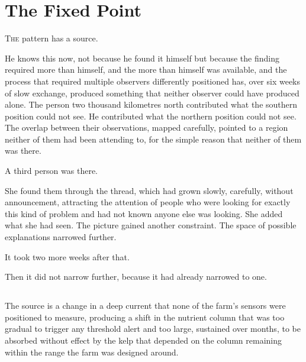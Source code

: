 
\chapter{The Fixed Point}


\lettrine{T}{he} pattern has a source.

He knows this now, not because he found it himself
but because the finding required more than himself,
and the more than himself was available, and the
process that required multiple observers differently
positioned has, over six weeks of slow exchange,
produced something that neither observer could have
produced alone. The person two thousand kilometres
north contributed what the southern position could
not see. He contributed what the northern position
could not see. The overlap between their observations,
mapped carefully, pointed to a region neither of them
had been attending to, for the simple reason that
neither of them was there.

A third person was there.

She found them through the thread, which had grown
slowly, carefully, without announcement, attracting
the attention of people who were looking for exactly
this kind of problem and had not known anyone else
was looking. She added what she had seen. The picture
gained another constraint. The space of possible
explanations narrowed further.

It took two more weeks after that.

Then it did not narrow further, because it had
already narrowed to one.

\section{}

The source is a change in a deep current that
none of the farm's sensors were positioned to
measure, producing a shift in the nutrient column
that was too gradual to trigger any threshold
alert and too large, sustained over months, to
be absorbed without effect by the kelp that
depended on the column remaining within the
range the farm was designed around.

